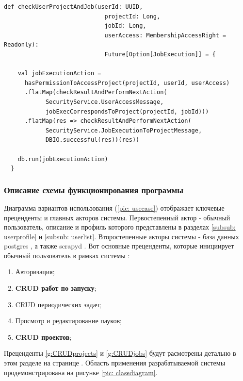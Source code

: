 \documentclass[a4paper,12pt]{article}
\begin{document}
	\begin{lstlisting}[frame=single, basicstyle=\footnotesize\ttfamily, label={lst:func}, caption={Функция для проверки доступа пользователя и запуска},captionpos=b]
def checkUserProjectAndJob(userId: UUID,
                             projectId: Long,
                             jobId: Long,
                             userAccess: MembershipAccessRight = Readonly):
                             Future[Option[JobExecution]] = {

    val jobExecutionAction =
      hasPermissionToAccessProject(projectId, userId, userAccess)
      .flatMap(checkResultAndPerformNextAction(
            SecurityService.UserAccessMessage, 
            jobExecCorrespondsToProject(projectId, jobId)))
      .flatMap(res => checkResultAndPerformNextAction(
            SecurityService.JobExecutionToProjectMessage, 
            DBIO.successful(res))(res))

    db.run(jobExecutionAction)
  }
	\end{lstlisting}
	
	\subsubsection{Описание схемы функционирования программы}
	
	Диаграмма вариантов использования (\ref{pic: usecase}) отображает ключевые преценденты и главных акторов системы. Первостепенный актор - обычный пользователь, описание и профиль которого представлены в разделах \ref{subsub: userprofile} и \ref{subsub: userlist}. Второстепенные акторы системы - база данных postgres \cite{postgresql}, а также scrapyd \cite{scrapyd}. Вот основные преценденты, которые инициирует обычный пользователь в рамках системы :
	\begin{enumerate}
	    \item Авторизация;
	    \item \textbf{CRUD работ по запуску};
	    \label{g:CRUDjobs}
	    \item CRUD периодических задач;
	    \item Просмотр и редактирование пауков;
	    \item \textbf{CRUD проектов};
	    \label{g:CRUDprojects}
	\end{enumerate}
	
Преценденты \ref{g:CRUDprojects} и \ref{g:CRUDjobs} будут расмотрены детально в этом разделе на странице \pageref{s: spec}.  Область применения разрабатываемой системы продемонстрирована на рисунке \ref{pic: classdiagram}. 
	
\end{document}

